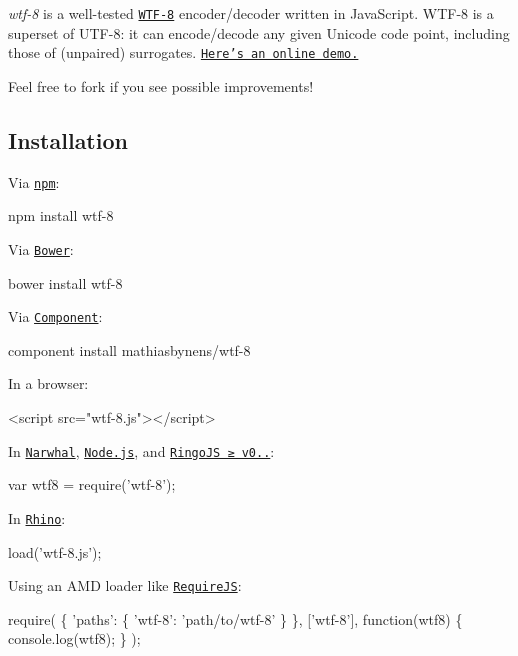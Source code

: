 {\itshape wtf-\/8} is a well-\/tested \href{https://simonsapin.github.io/wtf-8/}{\tt W\+T\+F-\/8} encoder/decoder written in Java\+Script. W\+T\+F-\/8 is a superset of U\+T\+F-\/8\+: it can encode/decode any given Unicode code point, including those of (unpaired) surrogates. \href{https://mothereff.in/wtf-8}{\tt Here’s an online demo.}

Feel free to fork if you see possible improvements!

\subsection*{Installation}

Via \href{http://npmjs.org/}{\tt npm}\+:


\begin{DoxyCode}
npm install wtf-8
\end{DoxyCode}


Via \href{http://bower.io/}{\tt Bower}\+:


\begin{DoxyCode}
bower install wtf-8
\end{DoxyCode}


Via \href{https://github.com/component/component}{\tt Component}\+:


\begin{DoxyCode}
component install mathiasbynens/wtf-8
\end{DoxyCode}


In a browser\+:


\begin{DoxyCode}
<script src="wtf-8.js"></script>
\end{DoxyCode}


In \href{http://narwhaljs.org/}{\tt Narwhal}, \href{http://nodejs.org/}{\tt Node.\+js}, and \href{http://ringojs.org/}{\tt Ringo\+JS ≥ v0..}\+:


\begin{DoxyCode}
var wtf8 = require('wtf-8');
\end{DoxyCode}


In \href{http://www.mozilla.org/rhino/}{\tt Rhino}\+:


\begin{DoxyCode}
load('wtf-8.js');
\end{DoxyCode}


Using an A\+MD loader like \href{http://requirejs.org/}{\tt Require\+JS}\+:


\begin{DoxyCode}
require(
  \{
    'paths': \{
      'wtf-8': 'path/to/wtf-8'
    \}
  \},
  ['wtf-8'],
  function(wtf8) \{
    console.log(wtf8);
  \}
);
\end{DoxyCode}


